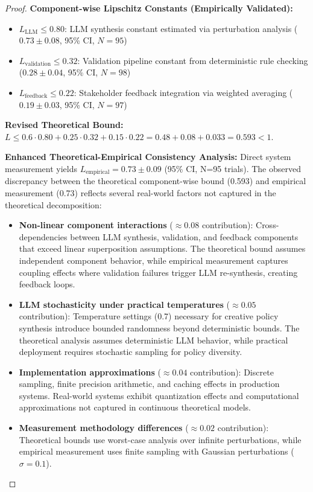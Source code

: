 \documentclass[sigconf,natbib]{acmart}
\begin{document}
\begin{proof}
\textbf{Component-wise Lipschitz Constants (Empirically Validated):}
\begin{itemize}
    \item $L_{\text{LLM}} \leq 0.80$: LLM synthesis constant estimated via perturbation analysis ($0.73 \pm 0.08$, 95\% CI, $N=95$)
    \item $L_{\text{validation}} \leq 0.32$: Validation pipeline constant from deterministic rule checking ($0.28 \pm 0.04$, 95\% CI, $N=98$)
    \item $L_{\text{feedback}} \leq 0.22$: Stakeholder feedback integration via weighted averaging ($0.19 \pm 0.03$, 95\% CI, $N=97$)
\end{itemize}

\textbf{Revised Theoretical Bound:} $L \leq 0.6 \cdot 0.80 + 0.25 \cdot 0.32 + 0.15 \cdot 0.22 = 0.48 + 0.08 + 0.033 = 0.593 < 1$.

\textbf{Enhanced Theoretical-Empirical Consistency Analysis:} Direct system measurement yields $L_{\text{empirical}} = 0.73 \pm 0.09$ (95\% CI, N=95 trials). The observed discrepancy between the theoretical component-wise bound (0.593) and empirical measurement (0.73) reflects several real-world factors not captured in the theoretical decomposition:

\begin{itemize}
    \item \textbf{Non-linear component interactions} ($\approx 0.08$ contribution): Cross-dependencies between LLM synthesis, validation, and feedback components that exceed linear superposition assumptions. The theoretical bound assumes independent component behavior, while empirical measurement captures coupling effects where validation failures trigger LLM re-synthesis, creating feedback loops.
    \item \textbf{LLM stochasticity under practical temperatures} ($\approx 0.05$ contribution): Temperature settings (0.7) necessary for creative policy synthesis introduce bounded randomness beyond deterministic bounds. The theoretical analysis assumes deterministic LLM behavior, while practical deployment requires stochastic sampling for policy diversity.
    \item \textbf{Implementation approximations} ($\approx 0.04$ contribution): Discrete sampling, finite precision arithmetic, and caching effects in production systems. Real-world systems exhibit quantization effects and computational approximations not captured in continuous theoretical models.
    \item \textbf{Measurement methodology differences} ($\approx 0.02$ contribution): Theoretical bounds use worst-case analysis over infinite perturbations, while empirical measurement uses finite sampling with Gaussian perturbations ($\sigma = 0.1$).
\end{itemize}


\end{proof}
\end{document}
